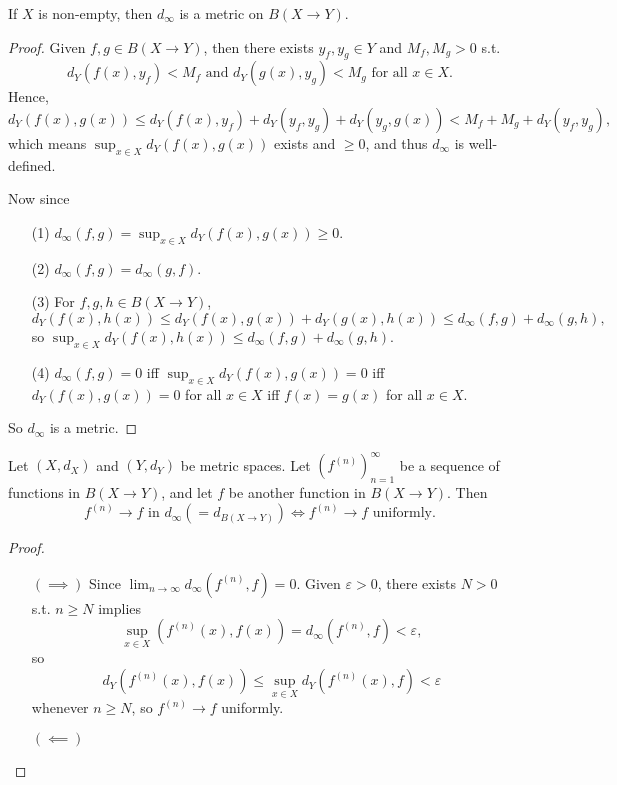 \begin{proposition}
    If \(X\) is non-empty, then \(d_\infty \) is a metric on \(B(X \to Y)\).  
\end{proposition}
\begin{proof}
    Given \(f, g \in B(X \to Y)\), then there exists \(y_f, y_g \in Y\) and \(M_f, M_g > 0\) s.t.
    \[
        d_Y (f(x), y_f) < M_f \text{ and } d_Y (g(x), y_g) < M_g \text{ for all } x \in X. 
    \]  
    Hence, 
    \[
        d_Y (f(x), g(x)) \le d_Y (f(x), y_f) + d_Y(y_f, y_g) + d_Y(y_g, g(x)) < M_f + M_g + d_Y(y_f, y_g),
    \] which means \(\sup _{x \in X} d_Y(f(x), g(x))\) exists and \(\ge 0\), and thus \(d_\infty \) is well-defined.  
    
    Now since 
    \begin{itemize}
        \item [(1)] \(d_\infty (f, g) = \sup _{x \in X} d_Y (f(x), g(x))\ge 0\). 
        \item [(2)] \(d_\infty (f, g) = d_\infty (g, f)\). 
        \item [(3)] For \(f, g, h \in B(X \to Y)\), 
        \[
            d_Y (f(x), h(x)) \le d_Y(f(x), g(x)) + d_Y (g(x), h(x)) \le d_\infty (f, g) + d_\infty (g, h),
        \]
        so \(\sup _{x \in X} d_Y(f(x), h(x)) \le d_\infty (f, g) + d_\infty (g, h)\). 
        \item [(4)] \(d_\infty (f, g) = 0\) iff \(\sup _{x \in X} d_Y (f(x), g(x)) = 0\) iff \(d_Y(f(x), g(x)) = 0\) for all \(x \in X\) iff \(f(x) = g(x)\) for all \(x \in X\).       
    \end{itemize}
    So \(d_\infty \) is a metric. 
\end{proof}

\begin{proposition} \label{prop: on doo converge iff uniformly convergent}
    Let \((X, d_X)\) and \((Y, d_Y)\) be metric spaces. Let \(\left( f^{(n)} \right)_{n=1}^{\infty}  \) be a sequence of functions in \(B(X \to Y)\), and let \(f\) be another function in \(B(X \to Y)\). Then      
    \[
        f^{(n)} \to f \text{ in } d_\infty ( = d_{B(X \to Y)}) \iff f^{(n)} \to f \text{ uniformly}.  
    \]
\end{proposition}
\begin{proof}
    \vphantom{text}
    \begin{itemize}
        \item [\((\implies )\)] Since \(\lim_{n \to \infty} d_\infty \left( f^{(n)}, f \right) = 0  \). Given \(\varepsilon > 0\), there exists \(N > 0\) s.t. \(n \ge N\) implies 
        \[
            \sup _{x \in X} \left( f^{(n)}(x), f(x) \right)  = d_\infty \left( f^{(n)}, f \right) < \varepsilon,
        \] so 
        \[
            d_Y \left( f^{(n)}(x), f(x) \right) \le \sup _{x \in X} d_Y\left( f^{(n)}(x), f \right) < \varepsilon 
        \] whenever \(n \ge N\), so \(f^{(n)} \to f\) uniformly.  
        \item [\((\impliedby )\)] 
    \end{itemize}
\end{proof}

